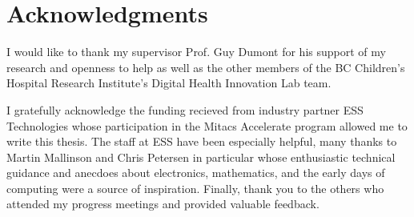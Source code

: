 
\chapter{Acknowledgments}

I would like to thank my supervisor Prof. Guy Dumont for his support of my research and openness to help as well as the other members of the BC Children's Hospital Research Institute's Digital Health Innovation Lab team.

I gratefully acknowledge the funding recieved from industry partner ESS Technologies whose participation in the Mitacs Accelerate program allowed me to write this thesis. The staff at ESS have been especially helpful, many thanks to Martin Mallinson and Chris Petersen in particular whose enthusiastic technical guidance and anecdoes about electronics, mathematics, and the early days of computing were a source of inspiration. Finally, thank you to the others who attended my progress meetings and provided valuable feedback.
